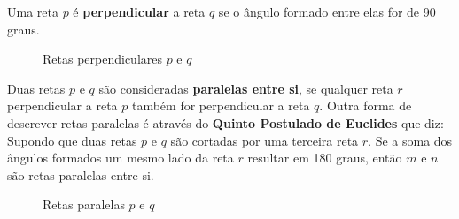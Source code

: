 \begin{multicols*}{2}

    Uma reta $p$ é \textbf{perpendicular} a reta $q$ se o ângulo formado entre elas for de 90 graus.
    
    \begin{figure}[H]
        \centering
        \caption{Retas perpendiculares $p$ e $q$}
    \end{figure}


    Duas retas $p$ e $q$ são consideradas \textbf{paralelas entre si}, se qualquer reta $r$ perpendicular a reta $p$ também for 
    perpendicular a reta $q$. Outra forma de descrever retas paralelas é através do \textbf{Quinto Postulado de Euclides}
    que diz: Supondo que duas retas $p$ e $q$ são cortadas por uma terceira reta $r$. Se a soma dos ângulos formados um 
    mesmo lado da reta $r$ resultar em 180 graus, então $m$ e $n$ são retas paralelas entre si.

    \begin{figure}[H]
        \centering
        \caption{Retas paralelas $p$ e $q$}
    \end{figure}


\end{multicols*}
